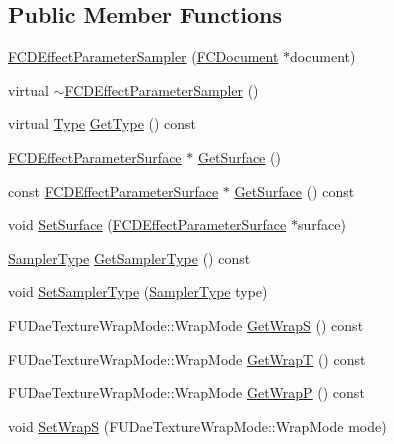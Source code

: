 \subsection*{Public Member Functions}
\begin{DoxyCompactItemize}
\item 
\hyperlink{classFCDEffectParameterSampler_a2f69f2f62504f6e0122254d738aac0b4}{FCDEffectParameterSampler} (\hyperlink{classFCDocument}{FCDocument} $\ast$document)
\item 
virtual \hyperlink{classFCDEffectParameterSampler_a55177a91bf15cb2168bceb2d7b32c5bf}{$\sim$FCDEffectParameterSampler} ()
\item 
virtual \hyperlink{classFCDEffectParameter_a1efe74553d2ed199435085c171743b08}{Type} \hyperlink{classFCDEffectParameterSampler_ab0483ddfcc3c69f12539df9fba36f0d6}{GetType} () const 
\item 
\hyperlink{classFCDEffectParameterSurface}{FCDEffectParameterSurface} $\ast$ \hyperlink{classFCDEffectParameterSampler_aa1d035030a9a82d64f65b7863b9812a2}{GetSurface} ()
\item 
const \hyperlink{classFCDEffectParameterSurface}{FCDEffectParameterSurface} $\ast$ \hyperlink{classFCDEffectParameterSampler_a291ce036d2d8a353368633eb677e972b}{GetSurface} () const 
\item 
void \hyperlink{classFCDEffectParameterSampler_a5e34b2e987fcdc73e65fafcf0d21036b}{SetSurface} (\hyperlink{classFCDEffectParameterSurface}{FCDEffectParameterSurface} $\ast$surface)
\item 
\hyperlink{classFCDEffectParameterSampler_ae3a82d31b80b3510bb44a62bd3c34424}{SamplerType} \hyperlink{classFCDEffectParameterSampler_a07aaa27b521ceaf9fb570eeb713bb41a}{GetSamplerType} () const 
\item 
void \hyperlink{classFCDEffectParameterSampler_aeb463b7fed44feccf05032b2274c4dcc}{SetSamplerType} (\hyperlink{classFCDEffectParameterSampler_ae3a82d31b80b3510bb44a62bd3c34424}{SamplerType} type)
\item 
FUDaeTextureWrapMode::WrapMode \hyperlink{classFCDEffectParameterSampler_a95b028a920ae04a45bbb9613c7754389}{GetWrapS} () const 
\item 
FUDaeTextureWrapMode::WrapMode \hyperlink{classFCDEffectParameterSampler_a80fa6f7d93d559c2a0382fa6fb3b13b0}{GetWrapT} () const 
\item 
FUDaeTextureWrapMode::WrapMode \hyperlink{classFCDEffectParameterSampler_abec9f4de7ac772c42c12ff6a1f76ee7c}{GetWrapP} () const 
\item 
void \hyperlink{classFCDEffectParameterSampler_a68a18ff96d3edeb67f15d5616e18ae75}{SetWrapS} (FUDaeTextureWrapMode::WrapMode mode)

\end{DoxyCompactItemize}
